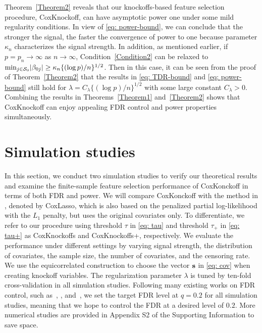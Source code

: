 \documentclass[11pt]{article}
\def\bs{{\bf s}}
\begin{document}
Theorem~\ref{Theorem2} reveals that our knockoffs-based feature selection procedure, CoxKnockoff, can have asymptotic power one under some mild regularity conditions. 
In view of \eqref{eq: power-bound}, we can conclude that the
stronger the signal, the faster the convergence of power to one because parameter $\kappa_n$ characterizes the signal strength.  In addition, as mentioned earlier, if $p=p_n\to\infty$ as $n\to\infty$, Condition~\ref{Condition2} can be relaxed to ${\rm min}_{j \in \mathcal{S}_{0}}|\beta_{0j}| \geq \kappa_{n}\{(\log p)/n\}^{1/2}$. Then in this case, it can be seen from the proof of Theorem~\ref{Theorem2} that the results in \eqref{eq: TDR-bound} and \eqref{eq: power-bound} still hold for $\lambda=C_{\lambda}\{(\log p)/n\}^{1/2}$ with some large constant $C_{\lambda}>0$. 
Combining the results in Theorems~\ref{Theorem1} and~\ref{Theorem2} shows that %
CoxKnockoff can enjoy appealing FDR control and power properties simultaneously.    




\section{Simulation studies}\label{sec: simulations}

In this section, we conduct two simulation studies to verify our theoretical results
and examine the
finite-sample feature selection performance of CoxKonckoff in terms of both FDR and power. We will compare CoxKonckoff with the method in \cite{tibshirani1997lasso}, denoted by  CoxLasso, which is also based on the penalized partial log-likelihood with the $L_1$ penalty, but uses the original covariates only. 
To differentiate, we refer to our procedure
using threshold $\tau$ in \eqref{eq: tau} and threshold $\tau_{+}$ in \eqref{eq: tau+} as CoxKnockoffs and CoxKnockoffs+, respectively.
We 
evaluate the performance under different settings by varying signal strength, the distribution of covariates, the sample size, the number of covariates, and the censoring rate.
We use the equicorrelated construction to choose the vector $\bs$ in \eqref{eq: cov} when creating knockoff variables.  
The regularization parameter $\lambda$ is tuned by ten-fold cross-validation in all simulation studies.
Following many existing works on FDR control, such as~\cite{barber2015controlling},  \cite{fan2020rank}, and~\cite{fan2020ipad}, we set the target FDR level at $q=0.2$ for
	all simulation studies, meaning that we hope to control the FDR at a desired level of $0.2$. More numerical studies are provided in Appendix S2 of the Supporting Information to save space.
\end{document}
